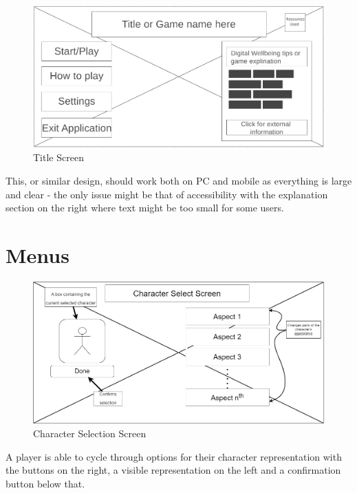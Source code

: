 \documentclass[a4paper]{scrreprt}
\begin{document}
\begin{figure}[H]
\centering
\includegraphics[width=1.1\textwidth]{TitleScreenWireFrame.PNG}
\caption{\label{fig:TS} Title Screen}
\end{figure} \noindent
This, or similar design, should work both on PC and mobile as everything is large and clear - the only issue might be that of accessibility with the explanation section on the right where text might be too small for some users.

\section{Menus}
\begin{figure}[H]
\centering
\includegraphics[width=1.1\textwidth]{CharacterSelectScreenWireFrame.png}
\caption{\label{fig:LSS} Character Selection Screen}
\end{figure}
\noindent A player is able to cycle through options for their character representation with the buttons on the right, a visible representation on the left and a confirmation button below that.
\end{document}
